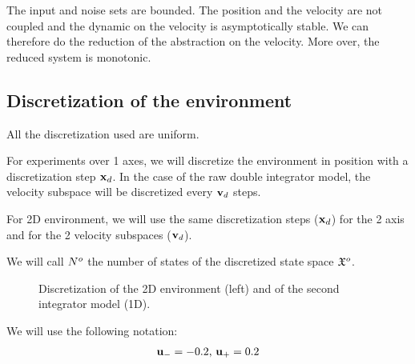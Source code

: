 The input and noise sets are bounded. The position and the velocity are not coupled and the dynamic on the velocity is asymptotically stable.
We can therefore do the reduction of the abstraction on the velocity. More over, the reduced system is monotonic.

\subsection{Discretization of the environment}
All the discretization used are uniform.

For experiments over 1 axes, we will discretize the environment in position with a discretization step $ \mathbf{x}_d$. In the case of the raw double integrator model, the velocity subspace will be discretized every $ \mathbf{v}_d$ steps.

For 2D environment, we will use the same discretization steps ($ \mathbf{x}_d$) for the 2 axis and for the 2 velocity subspaces ($ \mathbf{v}_d$).

We will call $N^o$ the number of states of the discretized state space $\mathfrak{X}^o$.

\begin{figure}
\centering
\begin{minipage}[b]{0.49\linewidth}

\end{minipage}
\begin{minipage}[b]{0.49\linewidth}

\end{minipage}
\caption{Discretization of the 2D environment (left) and of the second integrator model (1D).}
\end{figure}

We will use the following notation:
\begin{equation}
\begin{split}
 \mathbf{u}_{-} = -0.2
\textrm{, }
 \mathbf{u}_{+} = 0.2
\end{split}
\end{equation}
